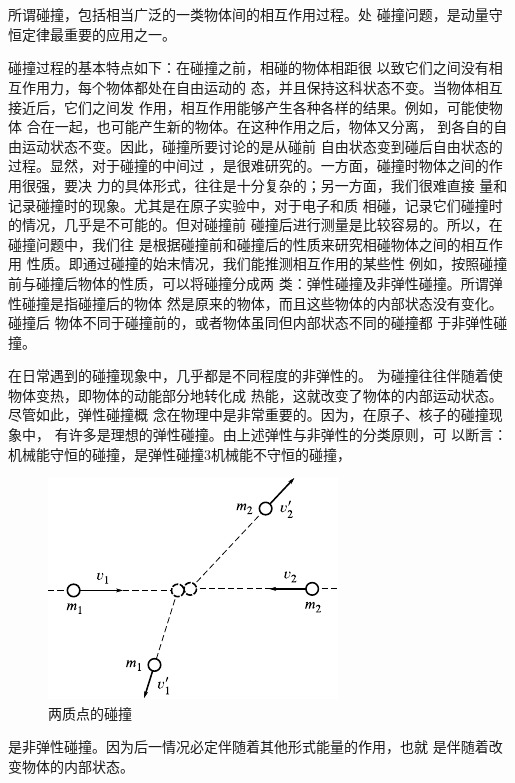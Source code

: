 \section[碰撞]{}\label{sec:08.03}

所谓碰撞，包括相当广泛的一类物体间的相互作用过程。处
碰撞问题，是动量守恒定律最重要的应用之一。

碰撞过程的基本特点如下：在碰撞之前，相碰的物体相距很
以致它们之间没有相互作用力，每个物体都处在自由运动的
态，并且保持这科状态不变。当物体相互接近后，它们之间发
作用，相互作用能够产生各种各样的结果。例如，可能使物体
合在一起，也可能产生新的物体。在这种作用之后，物体又分离，
到各自的自由运动状态不变。因此，碰撞所要讨论的是从碰前
自由状态变到碰后自由状态的过程。显然，对于碰撞的中间过
，是很难研究的。一方面，碰撞时物体之间的作用很强，要决
力的具体形式，往往是十分复杂的；另一方面，我们很难直接
量和记录碰撞时的现象。尤其是在原子实验中，对于电子和质
相碰，记录它们碰撞时的情况，几乎是不可能的。但对碰撞前
碰撞后进行测量是比较容易的。所以，在碰撞问题中，我们往
是根据碰撞前和碰撞后的性质来研究相碰物体之间的相互作用
性质。即通过碰撞的始末情况，我们能推测相互作用的某些性
例如，按照碰撞前与碰撞后物体的性质，可以将碰撞分成两
类：弹性碰撞及非弹性碰撞。所谓弹性碰撞是指碰撞后的物体
然是原来的物体，而且这些物体的内部状态没有变化。碰撞后
物体不同于碰撞前的，或者物体虽同但内部状态不同的碰撞都
于非弹性碰撞。

在日常遇到的碰撞现象中，几乎都是不同程度的非弹性的。
为碰撞往往伴随着使物体变热，即物体的动能部分地转化成
热能，这就改变了物体的内部运动状态。尽管如此，弹性碰撞概
念在物理中是非常重要的。因为，在原子、核子的碰撞现象中，
有许多是理想的弹性碰撞。由上述弹性与非弹性的分类原则，可
以断言：机械能守恒的碰撞，是弹性碰撞3机械能不守恒的碰撞，
\begin{figure}
  \centering
  \includegraphics{figure/fig08.05}
  \caption{两质点的碰撞}
  \label{fig:08.05}
\end{figure}
是非弹性碰撞。因为后一情况必定伴随着其他形式能量的作用，也就
是伴随着改变物体的内部状态。

